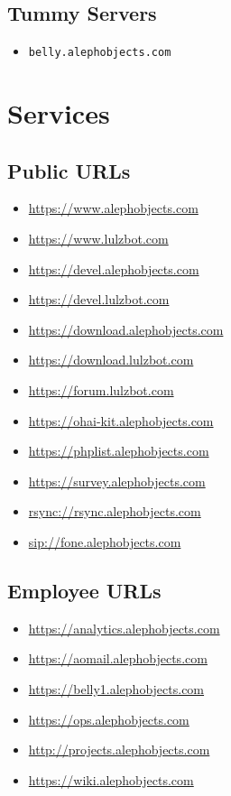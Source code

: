 \subsection{Tummy Servers}
\begin{itemize}
\item \texttt{belly.alephobjects.com}
\end{itemize}

\section{Services}
\subsection{Public URLs}
\begin{itemize}
\item \url{https://www.alephobjects.com}
\item \url{https://www.lulzbot.com}
\item \url{https://devel.alephobjects.com}
\item \url{https://devel.lulzbot.com}
\item \url{https://download.alephobjects.com}
\item \url{https://download.lulzbot.com}
\item \url{https://forum.lulzbot.com}
\item \url{https://ohai-kit.alephobjects.com}
\item \url{https://phplist.alephobjects.com}
\item \url{https://survey.alephobjects.com}
\item \url{rsync://rsync.alephobjects.com}
\item \url{sip://fone.alephobjects.com}
\end{itemize}

\subsection{Employee URLs}
\begin{itemize}
\item \url{https://analytics.alephobjects.com}
\item \url{https://aomail.alephobjects.com}
\item \url{https://belly1.alephobjects.com}
\item \url{https://ops.alephobjects.com}
\item \url{http://projects.alephobjects.com}
\item \url{https://wiki.alephobjects.com}
\end{itemize}

